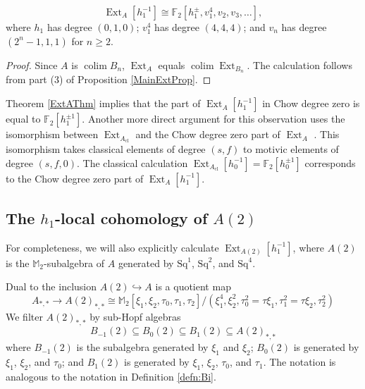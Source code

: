 \documentclass[10pt]{amsart}
\begin{document}
\begin{thm}\label{ExtAThm}
\[ \operatorname{Ext}_A[h_1^{-1}] {\cong} {\ensuremath{\mathbb{F}}}_2[h_1^\pm,v_1^4,v_2,v_3,\dots],
\]
where $h_1$ has degree $(0,1,0)$;
$v_1^4$ has degree $(4,4,4)$; and
$v_n$ has degree $(2^n-1,1,1)$ for $n \geq 2$.
\end{thm}

\begin{proof}
Since $A$ is $\operatorname*{colim} B_n$,
$\operatorname{Ext}_A$ equals $\operatorname*{colim} \operatorname{Ext}_{B_n}$.
The calculation follows from part (3) of Proposition \ref{MainExtProp}.
\end{proof}

\begin{rmk}
Theorem \ref{ExtAThm} implies that 
the part of $\operatorname{Ext}_A [h_1^{-1}]$ in Chow degree zero is equal to
${\ensuremath{\mathbb{F}}}_2[h_1^{\pm 1}]$.
Another more direct argument for this observation uses the
isomorphism between $\operatorname{Ext}_{A_{\mathrm{cl}}}$ and the Chow degree zero part of
$\operatorname{Ext}_A$ \cite{Istems}.  This isomorphism takes classical elements of degree 
$(s,f)$ to motivic elements of degree $(s,f,0)$. The classical calculation 
$\operatorname{Ext}_{A_{\mathrm{cl}}} [h_0^{-1} ] ={\ensuremath{\mathbb{F}}}_2 [h_0^{\pm 1}]$ corresponds to the Chow degree
zero part of $\operatorname{Ext}_A [h_1^{-1}]$.
\end{rmk}

\subsection{The $h_1$-local cohomology of $A(2)$}\label{sec:CohomA(2)}
For completeness, we will also explicitly calculate
$\operatorname{Ext}_{A(2)}[h_1^{-1}]$, where $A(2)$ is the ${\ensuremath{\mathbb{M}}}_2$-subalgebra 
of $A$ generated by ${\ensuremath{\mathrm{Sq}}}^1$, ${\ensuremath{\mathrm{Sq}}}^2$, and ${\ensuremath{\mathrm{Sq}}}^4$. 

Dual to the inclusion $A(2){\hookrightarrow} A$ is a quotient map
\[ A_{*,*} {\longrightarrow} A(2)_{*,*} {\cong} {\ensuremath{\mathbb{M}}}_2[\xi_1,\xi_2,\tau_0,\tau_1,\tau_2]/(\xi_1^4,\xi_2^2,\tau_0^2=\tau\xi_1,\tau_1^2=\tau\xi_2,\tau_2^2)\]
We filter $A(2)_{*,*}$ by sub-Hopf algebras
\[ B_{-1}(2)\subseteq B_0(2) \subseteq B_1(2)\subseteq A(2)_{*,*}\]
where $B_{-1}(2)$ is the subalgebra generated by $\xi_1$ and $\xi_2$;
$B_0(2)$ is generated by $\xi_1$, $\xi_2$, and $\tau_0$;
and $B_1(2)$ is generated by $\xi_1$, $\xi_2$, $\tau_0$, and $\tau_1$.
The notation is analogous to the notation in Definition \ref{defn:Bi}.
\end{document}
